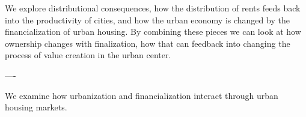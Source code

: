 We explore distributional consequences, how the distribution of rents feeds back into the productivity of cities, and how the urban economy is changed by the financialization of urban housing. %
By combining these pieces we can look at how ownership changes with finalization, how that can feedback into changing the process of value creation in the urban center.





----







We examine how urbanization and financialization interact through urban housing markets. %




